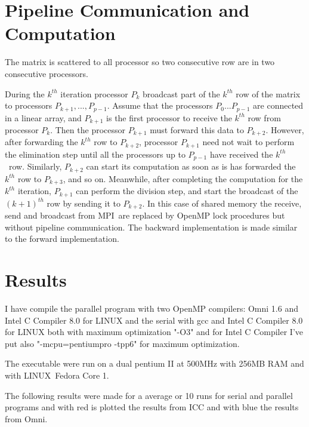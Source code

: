 \documentclass[a4paper]{article}
\begin{document}
\section{Pipeline Communication and Computation}

\bigskip The matrix is scattered to all processor so two consecutive row are
in two consecutive processors.

During the $k^{th}$ iteration processor $P_{k}$ broadcast part of the $k^{th}
$ row of the matrix to processors $P_{k+1},...,P_{p-1}$. Assume that the
processors $P_{0}...P_{p-1}$ are connected in a linear array, and $P_{k+1}$
is the first processor to receive the $k^{th}$ row from processor $P_{k}$.
Then the processor $P_{k+1}$ must forward this data to $P_{k+2}$. However,
after forwarding the $k^{th}$ row to $P_{k+2}$, processor $P_{k+1}$ need not
wait to perform the elimination step until all the processors up to $P_{p-1}$
have received the $k^{th}\,$\ row. Similarly, $P_{k+2}$ can start its
computation as soon as is has forwarded the $k^{th}$ row to $P_{k+3}$, and
so on. Meanwhile, after completing the computation for the $k^{th}$
iteration, $P_{k+1}$ can perform the division step, and start the broadcast
of the $(k+1)^{th}$ row by sending it to $P_{k+2}$. In this case of shared
memory the receive, send and broadcast from MPI\ are replaced by OpenMP lock
procedures but without pipeline communication. The backward implementation
is made similar to the forward implementation.

\section{Results}

I have compile the parallel program with two OpenMP compilers: Omni 1.6 and
Intel C Compiler 8.0 for LINUX and the serial with gcc and Intel C Compiler
8.0 for LINUX both with maximum optimization "-O3" and for Intel C Compiler
I've put also "-mcpu=pentiumpro -tpp6" for maximum optimization.

The executable were run on a dual pentium II at 500MHz with 256MB RAM and
with LINUX\ Fedora Core 1.

The following results were made for a average or 10 runs for serial and
parallel programs and with red is plotted the results from ICC and with blue
the results from Omni.

\begin{center}
\end{center}
\end{document}
